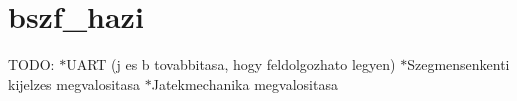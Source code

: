 \chapter{bszf\+\_\+hazi}
\hypertarget{md__r_e_a_d_m_e}{}\label{md__r_e_a_d_m_e}
\label{md__r_e_a_d_m_e_autotoc_md0}%
%


TODO\+: \texorpdfstring{$\ast$}{*}\+UART (j es b tovabbitasa, hogy feldolgozhato legyen) \texorpdfstring{$\ast$}{*}\+Szegmensenkenti kijelzes megvalositasa \texorpdfstring{$\ast$}{*}\+Jatekmechanika megvalositasa 